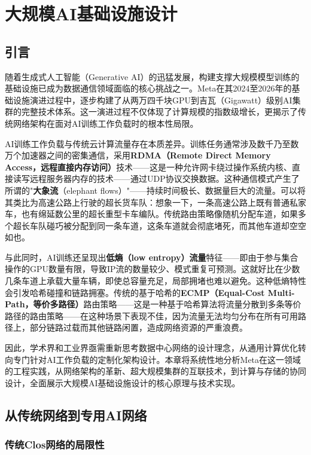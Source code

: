 \chapter{大规模AI基础设施设计}
\label{ch:ai-infrastructure}

\section{引言}

随着生成式人工智能（Generative AI）的迅猛发展，构建支撑大规模模型训练的基础设施已成为数据通信领域面临的核心挑战之一。Meta在其2024至2026年的基础设施演进过程中，逐步构建了从两万四千块GPU到吉瓦（Gigawatt）级别AI集群的完整技术体系。这一演进过程不仅体现了计算规模的指数级增长，更揭示了传统网络架构在面对AI训练工作负载时的根本性局限。

AI训练工作负载与传统云计算流量存在本质差异。训练任务通常涉及数千乃至数万个加速器之间的密集通信，采用\textbf{RDMA（Remote Direct Memory Access，远程直接内存访问）}技术——这是一种允许网卡绕过操作系统内核、直接读写远程服务器内存的技术——通过UDP协议交换数据。这种通信模式产生了所谓的"\textbf{大象流}（elephant flows）"——持续时间极长、数据量巨大的流量。可以将其类比为高速公路上行驶的超长货车队：想象一下，一条高速公路上既有普通私家车，也有绵延数公里的超长重型卡车编队。传统路由策略像随机分配车道，如果多个超长车队碰巧被分配到同一条车道，这条车道就会彻底堵死，而其他车道却空空如也。

与此同时，AI训练还呈现出\textbf{低熵（low entropy）流量}特征——即由于参与集合操作的GPU数量有限，导致IP流的数量较少、模式重复可预测。这就好比在少数几条车道上承载大量车辆，即使总容量充足，局部拥堵也难以避免。这种低熵特性会引发哈希碰撞和链路拥塞。传统的基于哈希的\textbf{ECMP（Equal-Cost Multi-Path，等价多路径）}路由策略——这是一种基于哈希算法将流量分散到多条等价路径的路由策略——在这种场景下表现不佳，因为流量无法均匀分布在所有可用路径上，部分链路过载而其他链路闲置，造成网络资源的严重浪费。

因此，学术界和工业界亟需重新思考数据中心网络的设计理念，从通用计算优化转向专门针对AI工作负载的定制化架构设计。本章将系统性地分析Meta在这一领域的工程实践，从网络架构的革新、超大规模集群的互联技术，到计算与存储的协同设计，全面展示大规模AI基础设施设计的核心原理与技术实现。

\section{从传统网络到专用AI网络}

\subsection{传统Clos网络的局限性}

